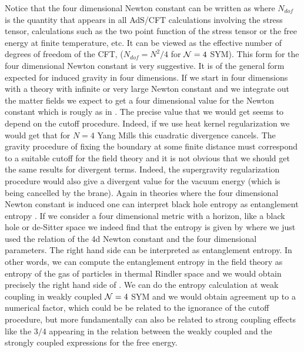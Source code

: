 Notice that the four dimensional Newton constant can be written as 
\eqn{}
where $N_{dof}$ is the quantity that appears in all AdS/CFT calculations
involving the stress tensor, calculations such as the two point
function of the stress tensor or the free energy at finite temperature,
etc. It can be viewed as the effective number of degrees of freedom
of the CFT, ($N_{dof} = N^2/4$ for ${\cal N} = 4 $ SYM).
 This form for the four dimensional Newton constant is very
suggestive. It is of the general form expected for induced gravity in
four dimensions. If we start in four dimensions with a theory with 
infinite or very large Newton constant and we integrate out the matter
fields we expect to get a four dimensional value for the Newton
constant which is rougly as in \fdnew  
{}. 
The precise value that we would get seems to depend on the cutoff
procedure.
Indeed, if we use heat kernel regularization we would get that for
$N=4$ Yang Mills this cuadratic divergence cancels. 
The  gravity procedure of fixing the boundary at some finite 
distance must correspond to a suitable cutoff for the field theory and
it is not obvious that we should get the same results for divergent terms. 
Indeed, the supergravity regularization procedure would also
give a divergent value for the vacuum energy (which is being cancelled by
the brane). 
Again in theories where the four dimensional Newton constant is induced 
one can interpret black hole entropy as entanglement entropy \tj. 
If we consider a four dimensional metric with a horizon, like a black hole
or de-Sitter space we indeed find that the entropy is given by 
\eqn{}
where we just used the relation of the 4d Newton constant and the
four dimensional parameters. The right hand side can be interpreted
as entanglement entropy. In other words, we can compute the 
entanglement entropy in the field theory as entropy of the 
gas of particles in thermal Rindler space and we would obtain
precisely the right hand side of \entr . We can do the entropy 
 calculation
at weak coupling in weakly coupled ${\cal N} =4$ SYM  and we would obtain 
agreement up to a numerical factor, which could be be related to
the ignorance of the cutoff procedure, but more fundamentally can 
also be related to strong coupling effects like the $3/4$ appearing in the 
relation between the weakly coupled and the strongly coupled expressions
for the free energy.

